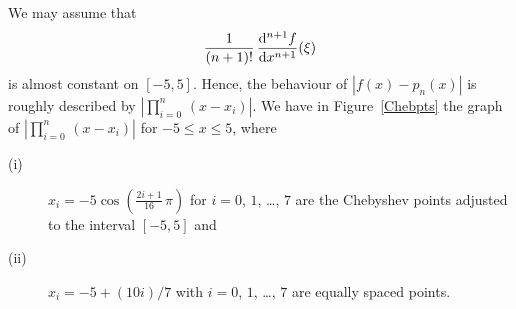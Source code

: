 \begin{rmkList}
\begin{enumerate}
We may assume that
\[
\frac{1}{(n+1)!}\,\frac{\mathrm{d}^{n+1}{f}}{\mathrm{d}{x}^{n+1}}(\xi)
\]
is almost constant on $[-5,5]$.   Hence, the behaviour of
$|f(x)-p_n(x)|$ is roughly described by
$\displaystyle \left|\prod_{i=0}^n\,(x-x_i)\right|$.
We have in Figure~\ref{Chebpts} the graph of
$\displaystyle \left|\prod_{i=0}^n\,(x-x_i)\right|$ for
$-5 \leq x \leq 5$, where
\begin{description}
\item[(i)]
$\displaystyle
x_i = -5\cos\left(\frac{2i+1}{16}\,\pi \right)$
for $i=0$, $1$, \ldots, $7$ are the Chebyshev points adjusted to the
interval $[-5,5]$ and
\item[(ii)]
$x_i = -5 + (10i)/7$ with $i=0$, $1$, \ldots, $7$ are equally
spaced points.
\end{description}
\end{enumerate}
\end{rmkList}


